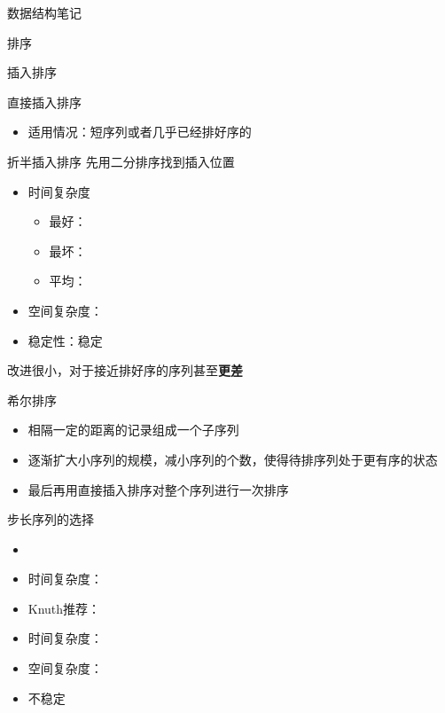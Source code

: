 \documentclass[
  ignorenonframetext,
]{beamer}
\providecommand{\tightlist}{%
  \setlength{\itemsep}{0pt}\setlength{\parskip}{0pt}}
\begin{document}
\begin{frame}[fragile]{数据结构笔记}
\begin{block}{排序}
\begin{block}{插入排序}
\begin{block}{直接插入排序}
\begin{itemize}
  \begin{itemize}
  \tightlist
  \item
    最好：{}
  \item
    最坏：{}
  \item
    平均：{}
  \end{itemize}
\item
  适用情况：短序列或者几乎已经排好序的
\end{itemize}
\end{block}

\begin{block}{折半插入排序}
\protect{}\label{ux6298ux534aux63d2ux5165ux6392ux5e8f}
先用二分排序找到插入位置

\begin{itemize}
\tightlist
\item
  时间复杂度

  \begin{itemize}
  \tightlist
  \item
    最好：{}
  \item
    最坏：{}
  \item
    平均：{}
  \end{itemize}
\item
  空间复杂度：{}
\item
  稳定性：稳定
\end{itemize}

改进很小，对于接近排好序的序列甚至\textbf{更差}
\end{block}

\begin{block}{希尔排序}
\protect{}\label{ux5e0cux5c14ux6392ux5e8f}
\begin{itemize}
\tightlist
\item
  相隔一定的距离的记录组成一个子序列
\item
  逐渐扩大小序列的规模，减小序列的个数，使得待排序列处于更有序的状态
\item
  最后再用直接插入排序对整个序列进行一次排序
\end{itemize}

\begin{block}{步长序列的选择}
\protect{}\label{ux6b65ux957fux5e8fux5217ux7684ux9009ux62e9}
\begin{itemize}
\item
  {}
\item
  时间复杂度：{}
\item
  Knuth推荐：{}
\item
  时间复杂度：{}
\item
  空间复杂度：{}
\item
  不稳定
\end{itemize}


\end{block}
\end{block}
\end{block}
\end{block}
\end{frame}
\end{document}
